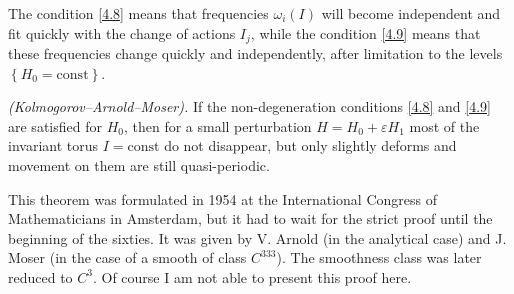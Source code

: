 The condition \eqref{4.8} means that frequencies $\omega _{i}(I)$ will become independent and fit quickly with the change of actions $I_{j}$, while the condition \eqref{4.9} means that these frequencies change quickly and independently, after limitation to the levels $\left\{ H_{0}=\textrm{const}\right\}$.

\begin{theorem}\emph{(Kolmogorov–Arnold–Moser).}
	If the non-degeneration conditions \eqref{4.8} and \eqref{4.9} are satisfied for $H_{0}$, then for a small perturbation $H=H_{0}+\varepsilon H_{1}$ most of the invariant torus ${I = \textrm{const}}$ do not disappear, but only slightly deforms and movement on them are still quasi-periodic.
\end{theorem}

This theorem was formulated in 1954 at the International Congress of Mathematicians in Amsterdam, but it had to wait for the strict proof until the beginning of the sixties. It was given by V. Arnold (in the analytical case) and J. Moser (in the case of a smooth of class $C^{333}$). The smoothness class was later reduced to $C^3$. Of course I am not able to present this proof here.

